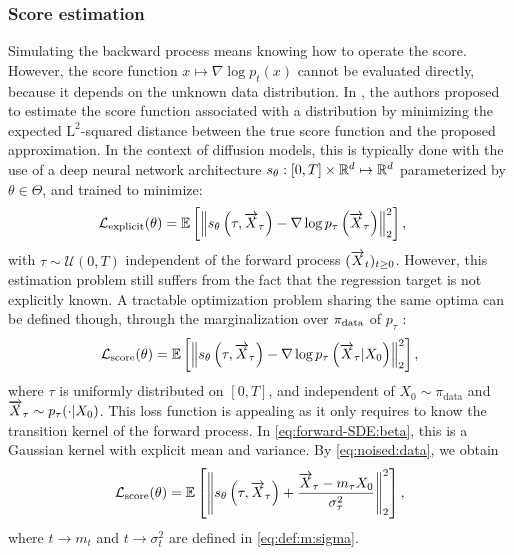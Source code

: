 \documentclass[english,graybox,envcountchap,envcountsame,sectrefs,shortlabels]{svmono}
\theoremstyle{style}
\newcommand{\eqsp}{}
\begin{document}
\subsubsection*{Score estimation}
Simulating the backward process means knowing how to operate the score.
However, the score function $x\mapsto \nabla \log p_t(x)$ cannot be evaluated directly, because it depends on the unknown data distribution. In \cite{hyvarinen2005estimation}, the authors proposed to estimate the score function associated with a distribution by minimizing the expected $\mathrm{L}^2$-squared distance between the true score function  and the proposed approximation. In the context of diffusion models, this is typically done with the use of a deep neural network architecture $s_{\theta} : [0,T] \times \mathbb{R}^d \mapsto \mathbb{R}^d$ parameterized by $\theta \in \Theta$,  and trained to minimize:
\begin{align} \label{eq:explicit_score_matching_objective}
\mathcal{L}_{\rm explicit} (\theta) &= \mathbb{E} \left[ \left\|  s_{\theta} \left(\tau, \ora X_{\tau}\right) - \nabla \log p_{\tau} \left(\ora X_{\tau}\right)  \right\|_2^2 \right]\eqsp,
\end{align}
with $\tau \sim \mathcal{U}(0,T)$ independent of the forward process $(\overrightarrow X_t)_{t\geq 0}$. However, this estimation problem still suffers from the fact that the regression target is not explicitly known. A tractable optimization problem sharing the same optima can be defined though, through the marginalization over $\pi_{\rm data}$ of $p_{\tau}$ \cite{song2021score}: 
\begin{align}
\label{eq:cond_score_matching_objective}
\mathcal{L}_{\mathrm{score}}(\param) = \mathbb{E}\left[ \left\|s_{\param} \left( \tau, \overrightarrow{X}_{\tau} \right) - \nabla \log p_\tau \left(\ora X _\tau| X _0 \right)\right\|_2^2\right]\eqsp,
\end{align}
where $\tau$ is uniformly distributed on $[0,T]$, and independent of $X_0\sim \pi_{\mathrm{data}}$ and $\overrightarrow X _\tau \sim p_\tau(\cdot| X _0)$. This loss function is appealing as it only requires to know the transition kernel of the forward process. In \eqref{eq:forward-SDE:beta}, this is a Gaussian kernel with explicit mean and variance. By \eqref{eq:noised:data}, we obtain 
\begin{align}
\label{eq:cond_score_matching_objective:explicit}
\mathcal{L}_{\mathrm{score}}(\param) = \mathbb{E}\left[ \left\|s_{\param} \left( \tau, \overrightarrow{X}_{\tau} \right) + \frac{\ora X _\tau -m_\tau X_0}{\sigma_\tau^2}\right\|_2^2\right]\eqsp,
\end{align}
where $t\to m_t$ and $t\to \sigma_t^2$ are defined in \eqref{eq:def:m:sigma}.
\end{document}
